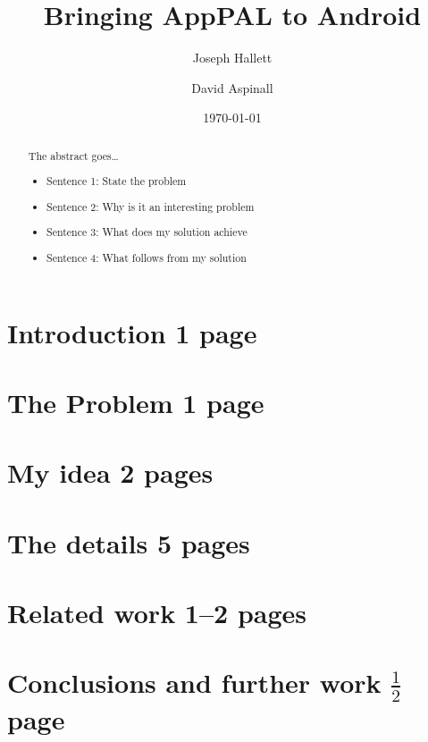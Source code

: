 \documentclass[a4paper]{article}
\title{Bringing AppPAL to Android}
\author{Joseph Hallett \and David Aspinall}
\date{\today}
\newcommand{\comment}[1]{\textsf{#1}}
\begin{document}
\maketitle

\begin{abstract}
  The abstract goes\ldots
  \begin{itemize}
    \item \comment{Sentence 1: State the problem}
    \item \comment{Sentence 2: Why is it an interesting problem}
    \item \comment{Sentence 3: What does my solution achieve}
    \item \comment{Sentence 4: What follows from my solution}
  \end{itemize}
\end{abstract}

\section{Introduction \comment{1 page}}

\section{The Problem \comment{1 page}}

\section{My idea \comment{2 pages}}

\section{The details \comment{5 pages}}

\section{Related work \comment{1--2 pages}}

\section{Conclusions and further work \comment{$\frac{1}{2}$ page}}



\end{document}
